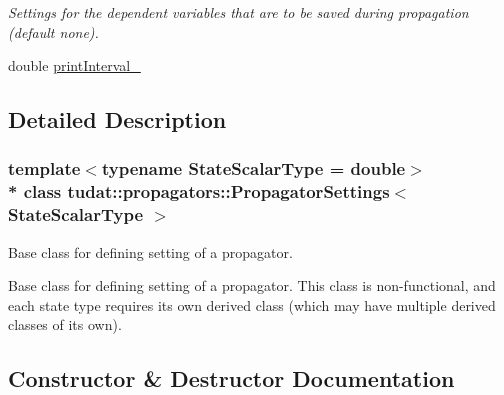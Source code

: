 \begin{DoxyCompactItemize}
\begin{DoxyCompactList}\small\item\em Settings for the dependent variables that are to be saved during propagation (default none). \end{DoxyCompactList}\item 
double \hyperlink{classtudat_1_1propagators_1_1PropagatorSettings_a9bc60706ee9ab673ed2caec05e716847}{print\+Interval\+\_\+}
\end{DoxyCompactItemize}


\subsection{Detailed Description}
\subsubsection*{template$<$typename State\+Scalar\+Type = double$>$\\*
class tudat\+::propagators\+::\+Propagator\+Settings$<$ State\+Scalar\+Type $>$}

Base class for defining setting of a propagator. 

Base class for defining setting of a propagator. This class is non-\/functional, and each state type requires its own derived class (which may have multiple derived classes of its own). 

\subsection{Constructor \& Destructor Documentation}
